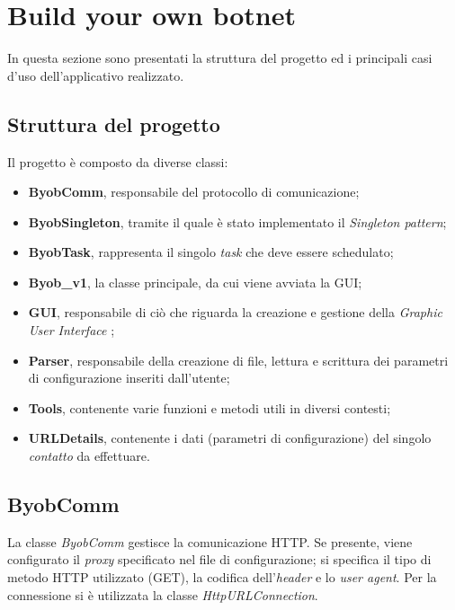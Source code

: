 \vspace*{1cm}
\section{Build your own botnet}
In questa sezione sono presentati la struttura del progetto ed i principali casi d'uso dell'applicativo realizzato.

\vspace*{0.5cm}
\subsection{Struttura del progetto}
Il progetto \`e composto da diverse classi:
\begin{itemize}
\item \textbf{ByobComm}, responsabile del protocollo di comunicazione;
\item \textbf{ByobSingleton}, tramite il quale \`{e} stato implementato il \textit{Singleton pattern};
\item \textbf{ByobTask}, rappresenta il singolo \textit{task} che deve essere schedulato;
\item \textbf{Byob\_v1}, la classe principale, da cui viene avviata la GUI;
\item \textbf{GUI}, responsabile di ci\`{o} che riguarda la creazione e gestione della \textit{Graphic User Interface} ;
\item \textbf{Parser}, responsabile della creazione di file, lettura e scrittura dei parametri di configurazione inseriti dall'utente;
\item \textbf{Tools}, contenente varie funzioni e metodi utili in diversi contesti;
\item \textbf{URLDetails}, contenente i dati (parametri di configurazione) del singolo \textit{contatto} da effettuare.
\end{itemize} 

\vspace*{0.5cm}
\subsection{ByobComm}
La classe \textit{ByobComm} gestisce la comunicazione HTTP.
Se presente, viene configurato il \textit{proxy} specificato nel file di configurazione; si specifica il tipo di metodo HTTP utilizzato (GET), la codifica dell'\textit{header} e lo \textit{user agent}.
Per la connessione si \`{e} utilizzata la classe \textit{HttpURLConnection}.

\vspace*{0.5cm}
